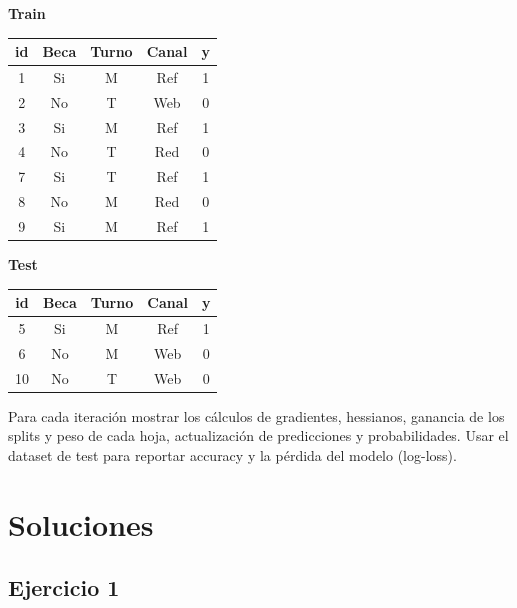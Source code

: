 \documentclass[12pt]{article}
\begin{document}
\begin{center}
\begin{minipage}{0.48\textwidth}
\centering
\textbf{Train}
\vspace{0.5em}

\begin{tabular}{|c|c|c|c|c|}
\hline
id & Beca & Turno & Canal & y \\
\hline
1 & Si  & M & Ref  & 1 \\
2 & No  & T & Web  & 0 \\
3 & Si  & M & Ref  & 1 \\
4 & No  & T & Red  & 0 \\
7 & Si  & T & Ref  & 1 \\
8 & No  & M & Red  & 0 \\
9 & Si  & M & Ref  & 1 \\
\hline
\end{tabular}
\end{minipage}\hfill
\begin{minipage}{0.48\textwidth}
\centering
\textbf{Test}
\vspace{0.5em}

\begin{tabular}{|c|c|c|c|c|}
\hline
id & Beca & Turno & Canal & y \\
\hline
5  & Si  & M & Ref & 1 \\
6  & No  & M & Web & 0 \\
10  & No & T & Web & 0 \\
\hline
\end{tabular}
\end{minipage}
\end{center}

\vspace{1em}

Para cada iteración mostrar los cálculos de gradientes, hessianos, ganancia de los splits y peso de cada hoja, actualización de predicciones y probabilidades. Usar el dataset de test para reportar accuracy y la pérdida del modelo (log-loss).

\newpage

\section{Soluciones}

\subsection{Ejercicio 1}
\end{document}
